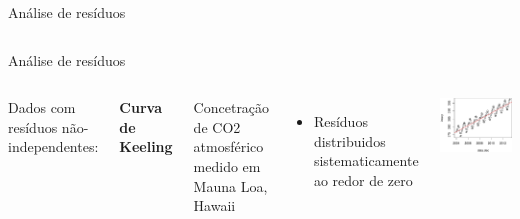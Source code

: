 \documentclass{beamer}\usepackage[]{graphicx}\usepackage[]{color}
\newenvironment{knitrout}{}{} %
\renewenvironment{knitrout}{\setlength{\topsep}{0mm}}{}
\begin{document}
\begin{frame}{Análise de resíduos}
\begin{columns}[c]
\begin{knitrout}
\end{knitrout}
\end{columns}

\end{frame}

\begin{frame}{Análise de resíduos}

\begin{columns}[c]

\small


Dados com resíduos não-independentes:

\bigskip
\textbf{Curva de Keeling }

Concetração de CO2 atmosférico medido em Mauna Loa, Hawaii
\bigskip
\begin{itemize}
\item Resíduos distribuidos sistematicamente ao redor de zero
\end{itemize}

\begin{knitrout}
\color{fgcolor}
\includegraphics[width=1\linewidth]{figure/r10-1} 


\end{knitrout}
\end{columns}
\end{frame}
\end{document}
